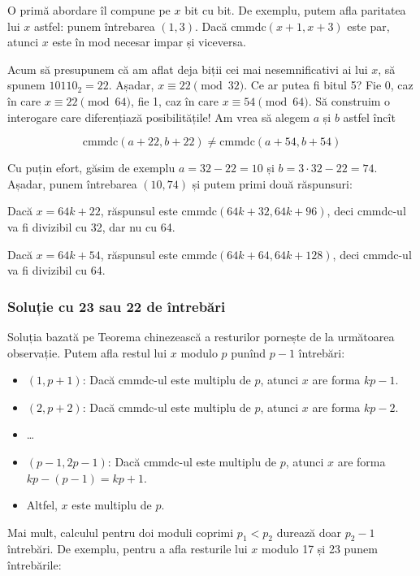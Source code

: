 \documentclass[../main.tex]{subfiles}
\begin{document}
O primă abordare îl compune pe $x$ bit cu bit. De exemplu, putem afla paritatea lui $x$ astfel: punem întrebarea $(1, 3)$. Dacă $\text{cmmdc}(x + 1, x + 3)$ este par, atunci $x$ este în mod necesar impar și viceversa.

Acum să presupunem că am aflat deja biții cei mai nesemnificativi ai lui $x$, să spunem $10110_{2}=22$. Așadar, $x \equiv 22 \pmod{32}$. Ce ar putea fi bitul 5? Fie 0, caz în care $x \equiv 22 \pmod{64}$, fie 1, caz în care $x \equiv 54 \pmod{64}$. Să construim o interogare care diferențiază posibilitățile! Am vrea să alegem $a$ și $b$ astfel încît

$$\text{cmmdc}(a + 22, b + 22) \neq \text{cmmdc}(a + 54, b + 54)$$

Cu puțin efort, găsim de exemplu $a = 32 - 22 = 10$ și $b = 3 \cdot 32 - 22 = 74$. Așadar, punem întrebarea $(10, 74)$ și putem primi două răspunsuri:

Dacă $x = 64k + 22$, răspunsul este $\text{cmmdc}(64k + 32, 64k + 96)$, deci cmmdc-ul va fi divizibil cu 32, dar nu cu 64.

Dacă $x = 64k + 54$, răspunsul este $\text{cmmdc}(64k + 64, 64k + 128)$, deci cmmdc-ul va fi divizibil cu 64.

\subsubsection*{Soluție cu 23 sau 22 de întrebări}

Soluția bazată pe Teorema chinezească a resturilor pornește de la următoarea observație. Putem afla restul lui $x$ modulo $p$ punînd $p-1$ întrebări:

\begin{itemize}
  \item $(1, p + 1)$: Dacă cmmdc-ul este multiplu de $p$, atunci $x$ are forma $kp - 1$.
  \item $(2, p + 2)$: Dacă cmmdc-ul este multiplu de $p$, atunci $x$ are forma $kp - 2$.
  \item \dots
  \item $(p-1, 2p-1)$: Dacă cmmdc-ul este multiplu de $p$, atunci $x$ are forma $kp - (p-1) = kp + 1$.
  \item Altfel, $x$ este multiplu de $p$.
\end{itemize}

Mai mult, calculul pentru doi moduli coprimi $p_1 < p_2$ durează doar $p_2 - 1$ întrebări. De exemplu, pentru a afla resturile lui $x$ modulo 17 și 23 punem întrebările:
\end{document}
